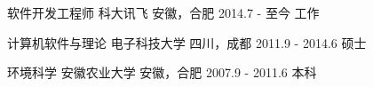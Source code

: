 

\begin{cventries}

  \cveduentry
    {软件开发工程师} %
    {科大讯飞} %
    {安徽，合肥} %
    {2014.7 - 至今} %
    {工作}

  \cveduentry
    {计算机软件与理论} %
    {电子科技大学} %
    {四川，成都} %
    {2011.9 - 2014.6} %
    {硕士}

  \cveduentry
    {环境科学} %
    {安徽农业大学} %
    {安徽，合肥} %
    {2007.9 - 2011.6} %
    {本科}

\end{cventries}
